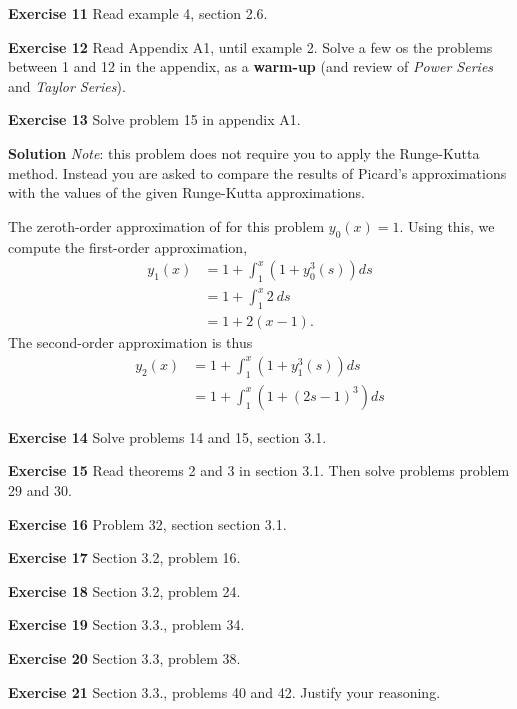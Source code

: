\documentclass[12pt,oneside]{exam}
\newenvironment{exercise}[1]{\vspace{.1in}\noindent\textbf{Exercise #1 \hspace{.05em}}}{}
\newenvironment{newsolution}{\vspace{.1in}\noindent\textbf{Solution \hspace{.05em}}}{}
\begin{document}
\begin{exercise}{11}
Read example 4, section 2.6. 
\end{exercise}

\begin{exercise}{12} 
Read Appendix A1, until example 2. Solve a few os the problems between 1 and 12 in the appendix, as a \textbf{warm-up} (and review of \textit{Power Series} and \textit{Taylor Series}).
\end{exercise}

\begin{exercise}{13} 
Solve problem 15 in appendix A1. 
\end{exercise}

\begin{newsolution}
\textit{Note}: this problem does not require you to apply the Runge-Kutta method. Instead you are asked to compare the results of Picard's approximations with the values of the given Runge-Kutta approximations. 

The zeroth-order approximation of for this problem $y_0(x)=1$. Using this, we compute the first-order approximation, 
\begin{align*}
y_1(x) & =1+ \int_{1}^{x} (1+y_0^3(s)) ds \\
& =  1+ \int_{1}^{x} 2 \ ds \\
& = 1+2(x-1). 
\end{align*}
The second-order approximation is thus
\begin{align*}
y_2(x) & = 1+ \int_{1}^{x} (1+y_{1}^{3}(s)) ds \\
& = 1+ \int_{1}^{x} (1+ (2s-1)^3) ds
\end{align*}

\end{newsolution}

\begin{exercise}{14}
Solve problems 14 and 15, section 3.1. 
\end{exercise}

\begin{exercise}{15}
Read theorems 2 and 3 in section 3.1. Then solve problems problem 29 and 30. 
\end{exercise}

\begin{exercise}{16}
Problem 32, section section 3.1.
\end{exercise}

\begin{exercise}{17}
Section 3.2, problem 16. 
\end{exercise}

\begin{exercise}{18} 
Section 3.2, problem 24. 
\end{exercise}

\begin{exercise}{19}
Section 3.3., problem 34.
\end{exercise}

\begin{exercise}{20}
Section 3.3, problem 38. 
\end{exercise}

\begin{exercise}{21}
Section 3.3., problems 40 and 42. Justify your reasoning. 
\end{exercise}
\end{document}

